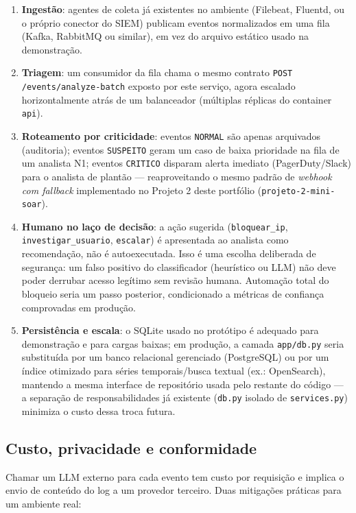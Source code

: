 \documentclass[11pt,a4paper]{article}
\begin{document}
\begin{enumerate}
  \item \textbf{Ingestão}: agentes de coleta já existentes no ambiente (Filebeat,
  Fluentd, ou o próprio conector do SIEM) publicam eventos normalizados em uma fila
  (Kafka, RabbitMQ ou similar), em vez do arquivo estático usado na demonstração.
  \item \textbf{Triagem}: um consumidor da fila chama o mesmo contrato
  \texttt{POST /events/analyze-batch} exposto por este serviço, agora escalado
  horizontalmente atrás de um balanceador (múltiplas réplicas do container \texttt{api}).
  \item \textbf{Roteamento por criticidade}: eventos \texttt{NORMAL} são apenas
  arquivados (auditoria); eventos \texttt{SUSPEITO} geram um caso de baixa prioridade
  na fila de um analista N1; eventos \texttt{CRITICO} disparam alerta imediato
  (PagerDuty/Slack) para o analista de plantão --- reaproveitando o mesmo padrão de
  \emph{webhook com fallback} implementado no Projeto 2 deste portfólio
  (\texttt{projeto-2-mini-soar}).
  \item \textbf{Humano no laço de decisão}: a ação sugerida (\texttt{bloquear\_ip},
  \texttt{investigar\_usuario}, \texttt{escalar}) é apresentada ao analista como
  recomendação, não é autoexecutada. Isso é uma escolha deliberada de segurança: um
  falso positivo do classificador (heurístico ou LLM) não deve poder derrubar acesso
  legítimo sem revisão humana. Automação total do bloqueio seria um passo posterior,
  condicionado a métricas de confiança comprovadas em produção.
  \item \textbf{Persistência e escala}: o SQLite usado no protótipo é adequado para
  demonstração e para cargas baixas; em produção, a camada \texttt{app/db.py} seria
  substituída por um banco relacional gerenciado (PostgreSQL) ou por um índice
  otimizado para séries temporais/busca textual (ex.: OpenSearch), mantendo a mesma
  interface de repositório usada pelo restante do código --- a separação de
  responsabilidades já existente (\texttt{db.py} isolado de \texttt{services.py})
  minimiza o custo dessa troca futura.
\end{enumerate}

\subsection{Custo, privacidade e conformidade}

Chamar um LLM externo para cada evento tem custo por requisição e implica o envio de
conteúdo do log a um provedor terceiro. Duas mitigações práticas para um ambiente real:
\end{document}
